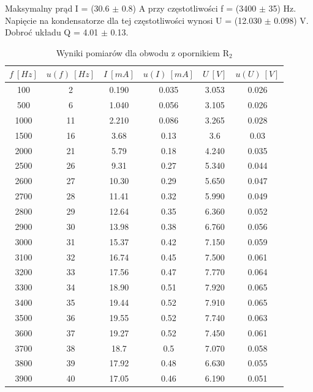 \documentclass[12pt, a4paper, oneside]{article}
\begin{document}
\begin{center}
Maksymalny prąd I = (30.6 $\pm$ 0.8) A przy częstotliwości f = (3400 $\pm$ 35) Hz.\\
Napięcie na kondensatorze dla tej częstotliwości wynosi U = (12.030 $\pm$ 0.098) V.\\
Dobroć układu Q = 4.01 $\pm$ 0.13.
\end{center}
\clearpage
\begin{table}[h]
  \centering
  \caption{Wyniki pomiarów dla obwodu z opornikiem R$_2$}
    \begin{tabular}{|c|c|c|c|c|c|}\hline
    $f~[Hz]$ & $u(f)~[Hz]$ & $I~[mA]$ & $u(I)~[mA]$ & $U~[V]$ & $u(U)~[V]$ \\\hline
    100 & 2 & 0.190 & 0.035 & 3.053 & 0.026 \\\hline
    500 & 6 & 1.040 & 0.056 & 3.105 & 0.026 \\\hline
    1000 & 11 & 2.210 & 0.086 & 3.265 & 0.028 \\\hline
    1500 & 16 & 3.68 & 0.13 & 3.6 & 0.03 \\\hline
    2000 & 21 & 5.79 & 0.18 & 4.240 & 0.035 \\\hline
    2500 & 26 & 9.31 & 0.27 & 5.340 & 0.044 \\\hline
    2600 & 27 & 10.30 & 0.29 & 5.650 & 0.047 \\\hline
    2700 & 28 & 11.41 & 0.32 & 5.990 & 0.049 \\\hline
    2800 & 29 & 12.64 & 0.35 & 6.360 & 0.052 \\\hline
    2900 & 30 & 13.98 & 0.38 & 6.760 & 0.056 \\\hline
    3000 & 31 & 15.37 & 0.42 & 7.150 & 0.059 \\\hline
    3100 & 32 & 16.74 & 0.45 & 7.500 & 0.061 \\\hline
    3200 & 33 & 17.56 & 0.47 & 7.770 & 0.064 \\\hline
    3300 & 34 & 18.90 & 0.51 & 7.920 & 0.065 \\\hline
    3400 & 35 & 19.44 & 0.52 & 7.910 & 0.065 \\\hline
    3500 & 36 & 19.55 & 0.52 & 7.740 & 0.063 \\\hline
    3600 & 37 & 19.27 & 0.52 & 7.450 & 0.061 \\\hline
    3700 & 38 & 18.7 & 0.5 & 7.070 & 0.058 \\\hline
    3800 & 39 & 17.92 & 0.48 & 6.630 & 0.055 \\\hline
    3900 & 40 & 17.05 & 0.46 & 6.190 & 0.051 \\\hline

\end{tabular}
\end{table}
\end{document}
